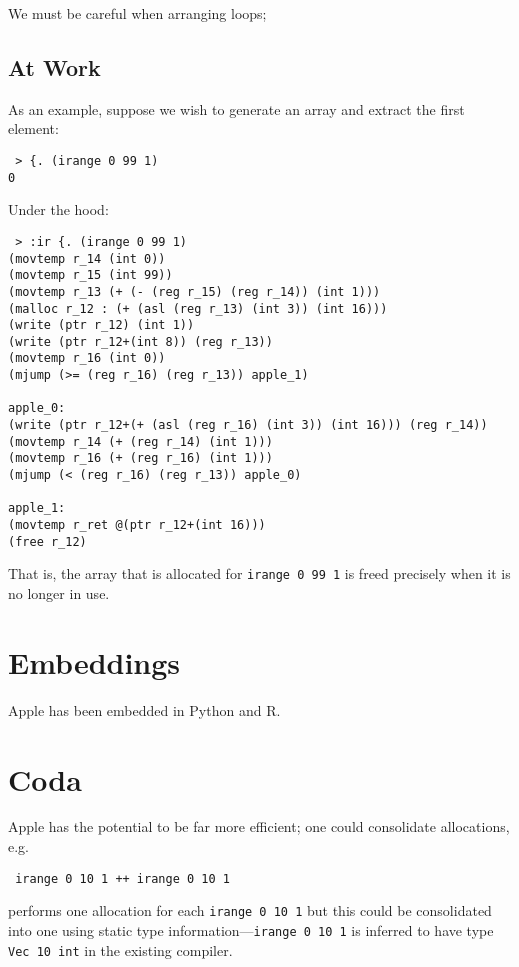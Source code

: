 \documentclass{article}
\begin{document}
We must be careful when arranging loops;

\subsection{At Work}

As an example, suppose we wish to generate an array and extract the first element:

\begin{verbatim}
 > {. (irange 0 99 1)
0
\end{verbatim}

Under the hood:

\begin{verbatim}
 > :ir {. (irange 0 99 1)
(movtemp r_14 (int 0))
(movtemp r_15 (int 99))
(movtemp r_13 (+ (- (reg r_15) (reg r_14)) (int 1)))
(malloc r_12 : (+ (asl (reg r_13) (int 3)) (int 16)))
(write (ptr r_12) (int 1))
(write (ptr r_12+(int 8)) (reg r_13))
(movtemp r_16 (int 0))
(mjump (>= (reg r_16) (reg r_13)) apple_1)

apple_0:
(write (ptr r_12+(+ (asl (reg r_16) (int 3)) (int 16))) (reg r_14))
(movtemp r_14 (+ (reg r_14) (int 1)))
(movtemp r_16 (+ (reg r_16) (int 1)))
(mjump (< (reg r_16) (reg r_13)) apple_0)

apple_1:
(movtemp r_ret @(ptr r_12+(int 16)))
(free r_12)
\end{verbatim}

That is, the array that is allocated for {\tt irange 0 99 1} is freed precisely when it is no longer in use.



\section{Embeddings}

Apple has been embedded in Python and R.

\section{Coda}

Apple has the potential to be far more efficient; one could consolidate allocations, e.g.

\begin{verbatim}
 irange 0 10 1 ++ irange 0 10 1
\end{verbatim}

performs one allocation for each {\tt irange 0 10 1} but this could be consolidated into one using static type information---{\tt irange 0 10 1} is inferred to have type {\tt Vec 10 int} in the existing compiler.
\end{document}
